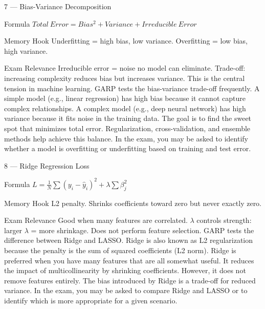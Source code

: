 \documentclass[aspectratio=169,8pt]{beamer}
\begin{document}
	\begin{frame}{7 --- Bias-Variance Decomposition}
		\begin{block}{Formula}
			$Total\ Error = Bias^2 + Variance + Irreducible\ Error$
		\end{block}
		\begin{block}{Memory Hook}
			Underfitting = high bias, low variance. Overfitting = low bias, high variance.
		\end{block}
		\begin{block}{Exam Relevance}
			Irreducible error = noise no model can eliminate. Trade-off: increasing complexity reduces bias but increases variance. This is the central tension in machine learning. GARP tests the bias-variance trade-off frequently. A simple model (e.g., linear regression) has high bias because it cannot capture complex relationships. A complex model (e.g., deep neural network) has high variance because it fits noise in the training data. The goal is to find the sweet spot that minimizes total error. Regularization, cross-validation, and ensemble methods help achieve this balance. In the exam, you may be asked to identify whether a model is overfitting or underfitting based on training and test error.
		\end{block}
	\end{frame}
	
	\begin{frame}{8 --- Ridge Regression Loss}
		\begin{block}{Formula}
			$L = \frac{1}{N}\sum(y_i - \hat{y}_i)^2 + \lambda\sum\beta_j^2$
		\end{block}
		\begin{block}{Memory Hook}
			L2 penalty. Shrinks coefficients toward zero but never exactly zero.
		\end{block}
		\begin{block}{Exam Relevance}
			Good when many features are correlated. $\lambda$ controls strength: larger $\lambda$ = more shrinkage. Does not perform feature selection. GARP tests the difference between Ridge and LASSO. Ridge is also known as L2 regularization because the penalty is the sum of squared coefficients (L2 norm). Ridge is preferred when you have many features that are all somewhat useful. It reduces the impact of multicollinearity by shrinking coefficients. However, it does not remove features entirely. The bias introduced by Ridge is a trade-off for reduced variance. In the exam, you may be asked to compare Ridge and LASSO or to identify which is more appropriate for a given scenario.
		\end{block}
	\end{frame}
	
\end{document}
